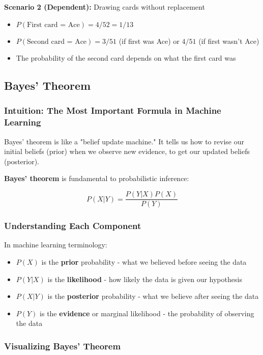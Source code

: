 \textbf{Scenario 2 (Dependent):} Drawing cards without replacement
\begin{itemize}
    \item $P(\text{First card = Ace}) = 4/52 = 1/13$
    \item $P(\text{Second card = Ace}) = 3/51$ (if first was Ace) or $4/51$ (if first wasn't Ace)
    \item The probability of the second card depends on what the first card was
\end{itemize}

\subsection{Bayes' Theorem}

\subsubsection{Intuition: The Most Important Formula in Machine Learning}

Bayes' theorem is like a "belief update machine." It tells us how to revise our initial beliefs (prior) when we observe new evidence, to get our updated beliefs (posterior).

\textbf{Bayes' theorem} is fundamental to probabilistic inference:

\begin{equation}
P(X|Y) = \frac{P(Y|X)P(X)}{P(Y)}
\end{equation}

\subsubsection{Understanding Each Component}

In machine learning terminology:
\begin{itemize}
    \item $P(X)$ is the \textbf{prior} probability - what we believed before seeing the data
    \item $P(Y|X)$ is the \textbf{likelihood} - how likely the data is given our hypothesis
    \item $P(X|Y)$ is the \textbf{posterior} probability - what we believe after seeing the data
    \item $P(Y)$ is the \textbf{evidence} or marginal likelihood - the probability of observing the data
\end{itemize}

\subsubsection{Visualizing Bayes' Theorem}

